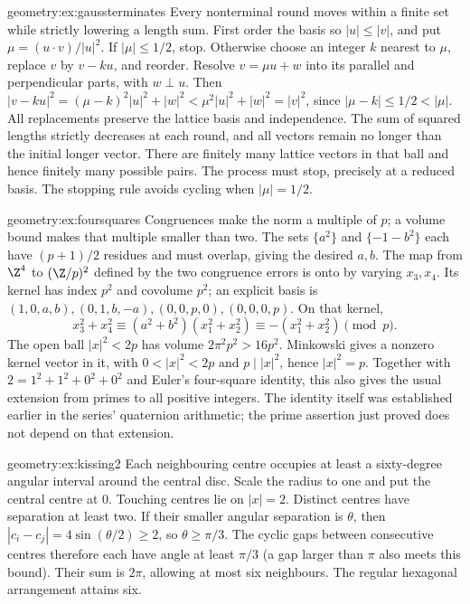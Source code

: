 \begin{solution}{geometry:ex:gaussterminates}
\idea Every nonterminal round moves within a finite set while strictly
lowering a length sum.
\writeup First order the basis so $|u|\le|v|$, and put
$\mu=(u\cdot v)/|u|^2$. If $|\mu|\le1/2$, stop.
Otherwise choose an integer $k$ nearest to $\mu$, replace $v$ by
$v-ku$, and reorder. Resolve $v=\mu u+w$ into its parallel and perpendicular parts, with $w\perp u$.
Then
$|v-ku|^2=(\mu-k)^2|u|^2+|w|^2<\mu^2|u|^2+|w|^2=|v|^2$,
since $|\mu-k|\le1/2<|\mu|$.
All replacements preserve the lattice basis and independence.
The sum of squared lengths strictly decreases at each round, and all
vectors remain no longer than the initial longer vector.
There are finitely many lattice vectors in that ball and hence finitely
many possible pairs. The process must stop, precisely at a reduced basis.
The stopping rule avoids cycling when $|\mu|=1/2$.
\end{solution}
\begin{solution}{geometry:ex:foursquares}
\idea Congruences make the norm a multiple of $p$; a volume bound makes
that multiple smaller than two.
\writeup The sets $\{a^2\}$ and $\{-1-b^2\}$ each have
$(p+1)/2$ residues and must overlap, giving the desired $a,b$.
The map from $\Z^4$ to $(\Z/p)^2$ defined by the two congruence errors
is onto by varying $x_3,x_4$. Its kernel has index $p^2$ and covolume
$p^2$; an explicit basis is
$(1,0,a,b),(0,1,b,-a),(0,0,p,0),(0,0,0,p)$.
On that kernel,
\[
 x_3^2+x_4^2\equiv(a^2+b^2)(x_1^2+x_2^2)
 \equiv-(x_1^2+x_2^2)\pmod p.
\]
The open ball $|x|^2<2p$ has volume $2\pi^2p^2>16p^2$.
Minkowski gives a nonzero kernel vector in it, with
$0<|x|^2<2p$ and $p\mid|x|^2$, hence $|x|^2=p$.
Together with $2=1^2+1^2+0^2+0^2$ and Euler's four-square identity,
this also gives the usual extension from primes to all positive integers.
The identity itself was established earlier in the series' quaternion
arithmetic; the prime assertion just proved does not depend on that extension.
\end{solution}
\begin{solution}{geometry:ex:kissing2}
\idea Each neighbouring centre occupies at least a sixty-degree angular
interval around the central disc.
\writeup Scale the radius to one and put the central centre at $0$.
Touching centres lie on $|x|=2$. Distinct centres have separation at
least two. If their smaller angular separation is $\theta$, then
$|c_i-c_j|=4\sin(\theta/2)\ge2$, so $\theta\ge\pi/3$.
The cyclic gaps between consecutive centres therefore each have angle
at least $\pi/3$ (a gap larger than $\pi$ also meets this bound).
Their sum is $2\pi$, allowing at most six neighbours.
The regular hexagonal arrangement attains six.
\end{solution}
